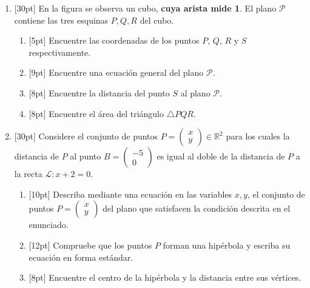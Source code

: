 \documentclass[11pt]{article}
\newcommand{\vect}[2]{\begin{pmatrix}#1\\#2\end{pmatrix}}
\begin{document}
\begin{enumerate}
\item{}[30pt] En la figura se observa un cubo, \textbf{cuya arista mide 1}. El plano $\mathcal{P}$ contiene las tres esquinas $P,Q,R$ del cubo.

\begin{center}
\end{center}

\begin{enumerate}[label=(\alph*)]
\item{}[5pt] Encuentre las coordenadas de los puntos $P$, $Q$, $R$ y $S$ respectivamente.
\item{}[9pt] Encuentre una ecuación general del plano $\mathcal{P}$.
\item{}[8pt] Encuentre la distancia del punto $S$ al plano $\mathcal{P}$.
\item{}[8pt] Encuentre el área del triángulo $\triangle PQR$.
\end{enumerate}

\item{}[30pt] Considere el conjunto de puntos $P=\vect{x}{y}\in\mathbb{R}^2$ para los cuales la distancia de $P$ al punto $B=\vect{-5}{0}$ es igual al doble de la distancia de $P$ a la recta $\mathcal{L}: x+2=0$.

\begin{enumerate}[label=(\alph*)]
\item{}[10pt] Describa mediante una ecuación en las variables $x,y$, el conjunto de puntos $P=\vect{x}{y}$ del plano que satisfacen la condición descrita en el enunciado.
\item{}[12pt] Compruebe que los puntos $P$ forman una hipérbola y escriba su ecuación en forma estándar.
\item{}[8pt] Encuentre el centro de la hipérbola y la distancia entre sus vértices.
\end{enumerate}
\end{enumerate}
\end{document}
